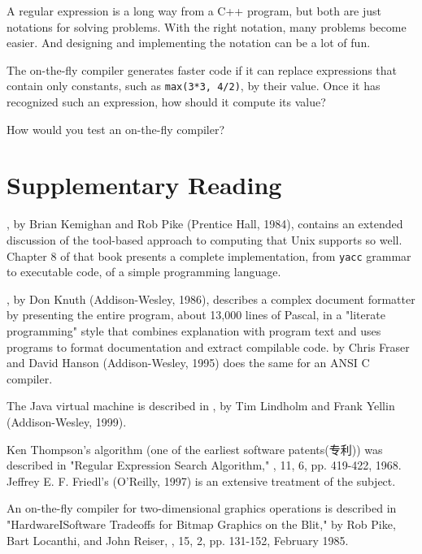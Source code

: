 A regular expression is a long way from a C++ program, but both are just
notations for solving problems. With the right notation, many problems
become easier.  And designing and implementing the notation can be a lot of
fun.

\begin{exercise}
    The on-the-fly compiler generates faster code if it can replace
    expressions that contain only constants, such as \verb'max(3*3, 4/2)',
    by their value. Once it has recognized such an expression, how should
    it compute its value?
\end{exercise}

\begin{exercise}
    How would you test an on-the-fly compiler?
\end{exercise}

\section*{Supplementary Reading}

, by Brian Kemighan and Rob Pike
(Prentice Hall, 1984), contains an extended discussion of the tool-based
approach to computing that Unix supports so well. Chapter 8 of that book
presents a complete implementation, from \verb'yacc' grammar to executable
code, of a simple programming language.

, by Don Knuth (Addison-Wesley, 1986), describes
a complex document formatter by presenting the entire program, about 13,000
lines of Pascal, in a "literate programming" style that combines
explanation with program text and uses programs to format documentation and
extract compilable code.  by Chris Fraser and David Hanson (Addison-Wesley, 1995)
does the same for an ANSI C compiler.

The Java virtual machine is described in , by Tim Lindholm and Frank Yellin
(Addison-Wesley, 1999).

Ken Thompson's algorithm (one of the earliest software patents(专利)) was
described in "Regular Expression Search Algorithm,"
, 11, 6, pp.  419-422, 1968. Jeffrey E.
F. Friedl's  (O'Reilly, 1997) is an
extensive treatment of the subject.

An on-the-fly compiler for two-dimensional graphics operations is described
in "HardwareISoftware Tradeoffs for Bitmap Graphics on the Blit," by Rob
Pike, Bart Locanthi, and John Reiser, , 15, 2, pp.  131-152, February 1985.
